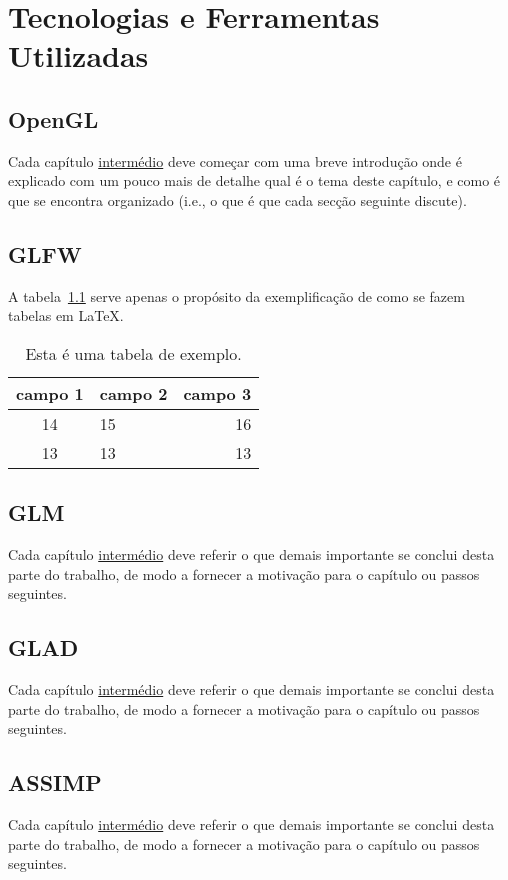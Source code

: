 \chapter{Tecnologias e Ferramentas Utilizadas}
\label{chap:tecno-ferra}

\section{OpenGL}
\label{chap2:sec:opengl}
Cada capítulo \underline{intermédio} deve começar com uma breve introdução onde é explicado com um pouco mais de detalhe qual é o tema deste capítulo, e como é que se encontra organizado (i.e., o que é que cada secção seguinte discute).

\section{GLFW}
\label{chap2:sec:...}

A tabela~\ref{tab:exemplo} serve apenas o propósito da exemplificação de como se fazem tabelas em \LaTeX.

\begin{table}
\centering
\begin{tabular}{|c|lr|}
\hline
\textbf{campo 1} & \textbf{campo 2} & \textbf{campo 3}\\
\hline
\hline
14 & 15 & 16 \\
\hline	
13 & 13 & 13 \\
\hline
\end{tabular}
\caption{Esta é uma tabela de exemplo.}
\label{tab:exemplo}
\end{table}

\section{GLM}
\label{chap2:sec:concs}
Cada capítulo \underline{intermédio} deve referir o que demais importante se conclui desta parte do trabalho, de modo a fornecer a motivação para o capítulo ou passos seguintes.

\section{GLAD}
\label{chap2:sec:concs}
Cada capítulo \underline{intermédio} deve referir o que demais importante se conclui desta parte do trabalho, de modo a fornecer a motivação para o capítulo ou passos seguintes.

\section{ASSIMP}
\label{chap2:sec:concs}
Cada capítulo \underline{intermédio} deve referir o que demais importante se conclui desta parte do trabalho, de modo a fornecer a motivação para o capítulo ou passos seguintes.